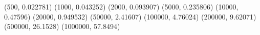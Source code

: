 (500, 0.022781) (1000, 0.043252) (2000, 0.093907) (5000, 0.235806) (10000, 0.47596) (20000, 0.949532) (50000, 2.41607) (100000, 4.76024) (200000, 9.62071) (500000, 26.1528) (1000000, 57.8494)